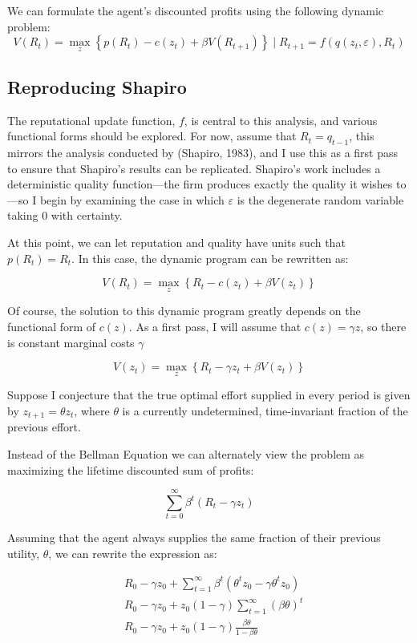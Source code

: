 \documentclass[
]{article}
\begin{document}
We can formulate the agent's discounted profits using the following
dynamic problem: \[
V(R_t)=\max_z\left\{p(R_t)-c(z_t)+\beta V(R_{t+1})\right\}\mid R_{t+1}=f(q(z_t,\varepsilon),R_t)
\]

\hypertarget{reproducing-shapiro}{%
\subsection{Reproducing Shapiro}\label{reproducing-shapiro}}

The reputational update function, \(f\), is central to this analysis,
and various functional forms should be explored. For now, assume that
\(R_{t}=q_{t-1}\), this mirrors the analysis conducted by (Shapiro,
1983), and I use this as a first pass to ensure that Shapiro's results
can be replicated. Shapiro's work includes a deterministic quality
function---the firm produces exactly the quality it wishes to---so I
begin by examining the case in which \(\varepsilon\) is the degenerate
random variable taking \(0\) with certainty.

At this point, we can let reputation and quality have units such that
\(p(R_t)=R_t\). In this case, the dynamic program can be rewritten as:

\[
V(R_t)=\max_z\left\{R_t-c(z_t)+\beta V(z_t)\right\}
\]

Of course, the solution to this dynamic program greatly depends on the
functional form of \(c(z)\). As a first pass, I will assume that
\(c(z)=\gamma z\), so there is constant marginal costs \(\gamma\)

\[
V(z_t)=\max_z\left\{R_t-\gamma z_t+\beta V(z_t)\right\}
\]

Suppose I conjecture that the true optimal effort supplied in every
period is given by \(z_{t+1}=\theta z_t\), where \(\theta\) is a
currently undetermined, time-invariant fraction of the previous effort.

Instead of the Bellman Equation we can alternately view the problem as
maximizing the lifetime discounted sum of profits:

\[
\sum_{t=0}^\infty \beta^t\left( R_t-\gamma z_t\right)
\]

Assuming that the agent always supplies the same fraction of their
previous utility, \(\theta\), we can rewrite the expression as:

\[
\begin{align*}
&R_0-\gamma z_0+\sum_{t=1}^\infty \beta^t\left( \theta^tz_0-\gamma \theta^tz_0\right)\\
&R_0-\gamma z_0+z_0(1-\gamma)\sum_{t=1}^\infty \left(\beta\theta\right)^t\\
&R_0-\gamma z_0+z_0(1-\gamma)\frac{\beta\theta}{1-\beta\theta}\\
\end{align*}
\]
\end{document}
